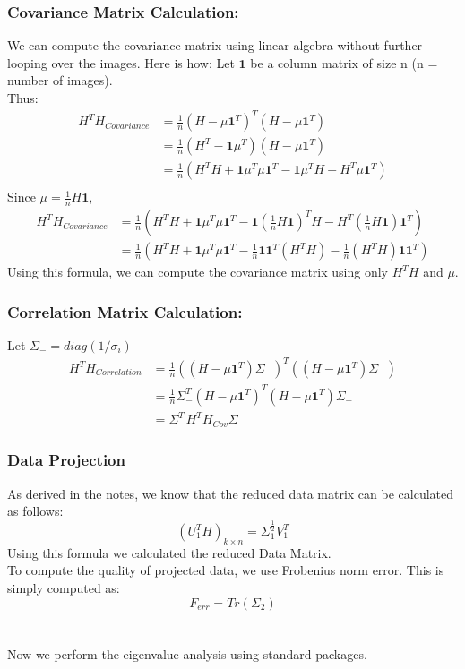 \documentclass[a4paper,11pt]{article}
\begin{document}
\subsubsection{Covariance Matrix Calculation:}
We can compute the covariance matrix using linear algebra without further looping over the images. Here is how:
Let $\textbf{1}$ be a column matrix of size n (n = number of images).\\
Thus:\\
\begin{align*}
    H^TH_{Covariance} &= \frac{1}{n}(H-\mu\textbf{1}^T)^T(H-\mu\textbf{1}^T)\\
    &= \frac{1}{n}(H^T-\textbf{1}\mu^T)(H-\mu\textbf{1}^T)\\
    &= \frac{1}{n}(H^TH+\textbf{1}\mu^T\mu\textbf{1}^T-\textbf{1}\mu^TH-H^T\mu\textbf{1}^T)\\
\end{align*}
Since $\mu = \frac{1}{n}H\textbf{1}$,
\begin{align*}
    H^TH_{Covariance} &= \frac{1}{n}(H^TH+\textbf{1}\mu^T\mu\textbf{1}^T-\textbf{1}\left(\frac{1}{n}H\textbf{1}\right)^TH-H^T\left(\frac{1}{n}H\textbf{1}\right)\textbf{1}^T)\\
    &= \frac{1}{n}(H^TH + \textbf{1}\mu^T\mu\textbf{1}^T - \frac{1}{n}\textbf{1}\textbf{1}^T(H^TH) - \frac{1}{n}(H^TH)\textbf{1}\textbf{1}^T)
\end{align*}
Using this formula, we can compute the covariance matrix using only $H^TH$ and $\mu$.
\subsubsection{Correlation Matrix Calculation:}
Let $\Sigma_{-} = diag(1/\sigma_i)$\\
\begin{align*}
    H^TH_{Correlation} &= \frac{1}{n}((H-\mu\textbf{1}^T)\Sigma_-)^T((H-\mu\textbf{1}^T)\Sigma_-)\\
    &= \frac{1}{n}\Sigma_-^T(H-\mu\textbf{1}^T)^T(H-\mu\textbf{1}^T)\Sigma_-\\
    &= \Sigma_-^TH^TH_{Cov}\Sigma_-
\end{align*}
\subsubsection{Data Projection}\label{sec:6.2.3}
As derived in the notes, we know that the reduced data matrix can be calculated as follows:\\
\begin{displaymath}
    (U_1^TH)_{k\times n} = \Sigma_1^{\frac{1}{2}}V_1^T
\end{displaymath}
Using this formula we calculated the reduced Data Matrix.\\
To compute the quality of projected data, we use Frobenius norm error. This is simply computed as:
\begin{displaymath}
    F_{err} = Tr(\Sigma_2)
\end{displaymath}
\\
\\
Now we perform the eigenvalue analysis using standard packages.
\end{document}
